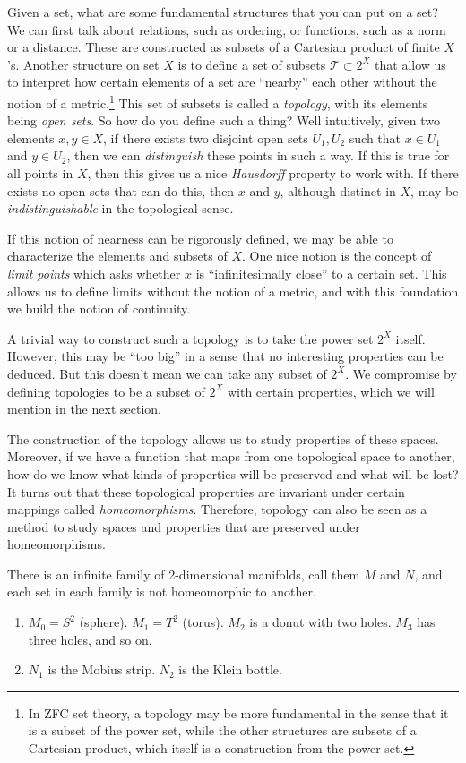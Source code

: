Given a set, what are some fundamental structures that you can put on a set? We can first talk about relations, such as ordering, or functions, such as a norm or a distance. These are constructed as subsets of a Cartesian product of finite $X$'s. Another structure on set $X$ is to define a set of subsets $\mathscr{T} \subset 2^X$ that allow us to interpret how certain elements of a set are ``nearby'' each other without the notion of a metric.\footnote{In ZFC set theory, a topology may be more fundamental in the sense that it is a subset of the power set, while the other structures are subsets of a Cartesian product, which itself is a construction from the power set.} This set of subsets is called a \textit{topology}, with its elements being \textit{open sets}. So how do you define such a thing? Well intuitively, given two elements $x, y \in X$, if there exists two disjoint open sets $U_1, U_2$ such that $x \in U_1$ and $y \in U_2$, then we can \textit{distinguish} these points in such a way. If this is true for all points in $X$, then this gives us a nice \textit{Hausdorff} property to work with. If there exists no open sets that can do this, then $x$ and $y$, although distinct in $X$, may be \textit{indistinguishable} in the topological sense. 

If this notion of nearness can be rigorously defined, we may be able to characterize the elements and subsets of $X$. One nice notion is the concept of \textit{limit points} which asks whether $x$ is ``infinitesimally close'' to a certain set. This allows us to define limits without the notion of a metric, and with this foundation we build the notion of continuity.    

A trivial way to construct such a topology is to take the power set $2^X$ itself. However, this may be ``too big'' in a sense that no interesting properties can be deduced. But this doesn't mean we can take any subset of $2^X$. We compromise by defining topologies to be a subset of $2^X$ with certain properties, which we will mention in the next section. 

The construction of the topology allows us to study properties of these spaces. Moreover, if we have a function that maps from one topological space to another, how do we know what kinds of properties will be preserved and what will be lost? It turns out that these topological properties are invariant under certain mappings called \textit{homeomorphisms}. Therefore, topology can also be seen as a method to study spaces and properties that are preserved under homeomorphisms. 

\begin{example}
  There is an infinite family of 2-dimensional manifolds, call them $M$ and $N$, and each set in each family is not homeomorphic to another.  
  \begin{enumerate}
    \item $M_0 = S^2$ (sphere). $M_1 = T^2$ (torus). $M_2$ is a donut with two holes. $M_3$ has three holes, and so on. 
    \item $N_1$ is the Mobius strip. $N_2$ is the Klein bottle. 
  \end{enumerate}
\end{example}

